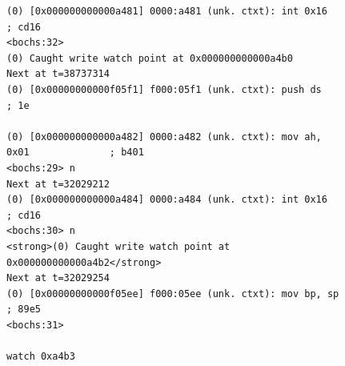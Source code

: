 \documentclass[a4paper]{article}
\begin{document}
\begin{appendices}
\begin{figure}
\begin{itemize}
\begin{lstlisting}[label=lst:errorlog, caption=DEBUG过程中捕捉到的错误信息。栈溢出意外修改到代码段内存]
(0) [0x000000000000a481] 0000:a481 (unk. ctxt): int 0x16                  ; cd16
<bochs:32>
(0) Caught write watch point at 0x000000000000a4b0
Next at t=38737314
(0) [0x00000000000f05f1] f000:05f1 (unk. ctxt): push ds                   ; 1e

(0) [0x000000000000a482] 0000:a482 (unk. ctxt): mov ah, 0x01              ; b401
<bochs:29> n
Next at t=32029212
(0) [0x000000000000a484] 0000:a484 (unk. ctxt): int 0x16                  ; cd16
<bochs:30> n
<strong>(0) Caught write watch point at 0x000000000000a4b2</strong>
Next at t=32029254
(0) [0x00000000000f05ee] f000:05ee (unk. ctxt): mov bp, sp                ; 89e5
<bochs:31>

watch 0xa4b3
    \end{lstlisting}
    \end{itemize}
    \end{figure}
\end{appendices}
\end{document}
